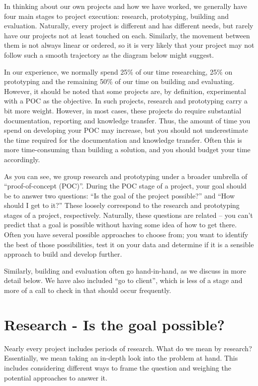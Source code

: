 \documentclass[
]{book}
\begin{document}
In thinking about our own projects and how we have worked, we generally have four main stages to project execution: research, prototyping, building and evaluation. Naturally, every project is different and has different needs, but rarely have our projects not at least touched on each. Similarly, the movement between them is not always linear or ordered, so it is very likely that your project may not follow such a smooth trajectory as the diagram below might suggest.

In our experience, we normally spend 25\% of our time researching, 25\% on prototyping and the remaining 50\% of our time on building and evaluating. However, it should be noted that some projects are, by definition, experimental with a POC as the objective. In such projects, research and prototyping carry a bit more weight. However, in most cases, these projects do require substantial documentation, reporting and knowledge transfer. Thus, the amount of time you spend on developing your POC may increase, but you should not underestimate the time required for the documentation and knowledge transfer. Often this is more time-consuming than building a solution, and you should budget your time accordingly.

As you can see, we group research and prototyping under a broader umbrella of ``proof-of-concept (POC)''. During the POC stage of a project, your goal should be to answer two questions: ``Is the goal of the project possible?'' and ``How should I get to it?'' These loosely correspond to the research and prototyping stages of a project, respectively. Naturally, these questions are related -- you can't predict that a goal is possible without having some idea of how to get there. Often you have several possible approaches to choose from; you want to identify the best of those possibilities, test it on your data and determine if it is a sensible approach to build and develop further.

Similarly, building and evaluation often go hand-in-hand, as we discuss in more detail below. We have also included ``go to client'', which is less of a stage and more of a call to check in that should occur frequently.

\hypertarget{research---is-the-goal-possible}{%
\section{Research - Is the goal possible?}\label{research---is-the-goal-possible}}

Nearly every project includes periods of research. What do we mean by research? Essentially, we mean taking an in-depth look into the problem at hand. This includes considering different ways to frame the question and weighing the potential approaches to answer it.
\end{document}
